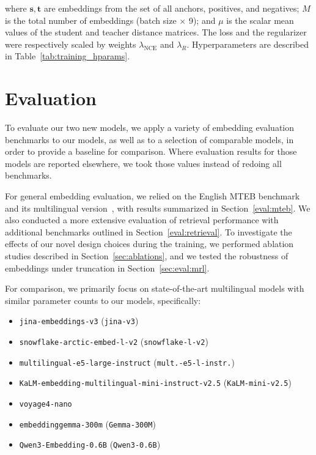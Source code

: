 \documentclass[11pt]{article}
\begin{document}
%
\noindent where $\bm{s}, \bm{t}$ are embeddings from the set of all anchors, positives, and negatives; $M$ is the total number of embeddings (batch size $\times$ 9); and $\mu$ is the scalar mean values of the student and teacher distance matrices. The loss and the regularizer were respectively scaled by weights $\lambda_{\text{NCE}}$ and $\lambda_R$. Hyperparameters are described in Table~\ref{tab:training_hparams}.

\section{Evaluation}
\label{sec:evaluation}

To evaluate our two new models, we apply a variety of embedding evaluation benchmarks to our models, as well as to a selection of comparable models, in order to provide a baseline for comparison. Where evaluation results for those models are reported elsewhere, we took those values instead of redoing all benchmarks.

For general embedding evaluation, we relied on the English MTEB benchmark~\cite{muennighoff2023mteb} and its multilingual version~\cite{enevoldsenmmteb}, with results summarized in Section~\ref{eval:mteb}.
We also conducted a more extensive evaluation of retrieval performance with additional benchmarks outlined in Section~\ref{eval:retrieval}.
To investigate the effects of our novel design choices during the training, we performed ablation studies described in Section~\ref{sec:ablations}, and we tested the robustness of embeddings under truncation in Section~\ref{sec:eval:mrl}.

For comparison, we primarily focus on state-of-the-art multilingual models with similar parameter counts to our models, specifically:
\begin{itemize}
    \item \texttt{jina-embeddings-v3} (\texttt{jina-v3})~\cite{sturua2025jina}
    \item \texttt{snowflake-arctic-embed-l-v2} (\texttt{snowflake-l-v2})~\cite{yu2024arctic}
    \item \texttt{multilingual-e5-large-instruct} (\texttt{mult.-e5-l-instr.})~\cite{wang2024multilingual}
    \item \texttt{KaLM-embedding-multilingual-\allowbreak{}mini-\allowbreak{}instruct-v2.5} (\texttt{KaLM-mini-v2.5})~\cite{zhao2025kalm}
    \item \texttt{voyage4-nano}~\cite{voyage4nano2026}
    \item \texttt{embeddinggemma-300m} (\texttt{Gemma-300M})~\cite{vera2025embeddinggemma}
    \item \texttt{Qwen3-Embedding-0.6B} (\texttt{Qwen3-0.6B}) \cite{zhang2025qwen3}
\end{itemize}
\end{document}
